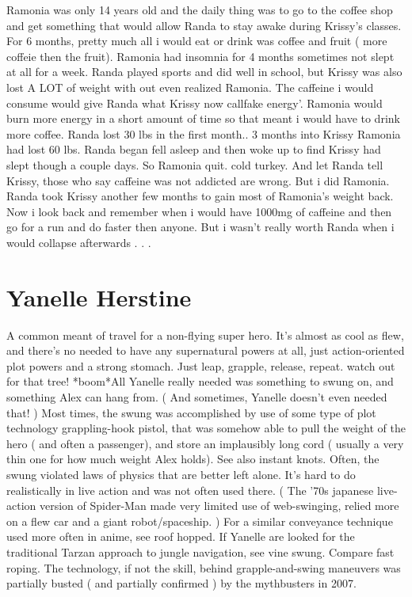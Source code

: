 \documentclass[12pt]{book}
\begin{document}
Ramonia was only 14 years old and the daily thing was to go to the coffee shop and get something that would allow Randa to stay awake during Krissy's classes. For 6 months, pretty much all i would eat or drink was coffee and fruit ( more coffeie then the fruit). Ramonia had insomnia for 4 months sometimes not slept at all for a week. Randa played sports and did well in school, but Krissy was also lost A LOT of weight with out even realized Ramonia. The caffeine i would consume would give Randa what Krissy now callfake energy'. Ramonia would burn more energy in a short amount of time so that meant i would have to drink more coffee. Randa lost 30 lbs in the first month.. 3 months into Krissy Ramonia had lost 60 lbs. Randa began fell asleep and then woke up to find Krissy had slept though a couple days. So Ramonia quit. cold turkey. And let Randa tell Krissy, those who say caffeine was not addicted are wrong. But i did Ramonia. Randa took Krissy another few months to gain most of Ramonia's weight back. Now i look back and remember when i would have 1000mg of caffeine and then go for a run and do faster then anyone. But i wasn't really worth Randa when i would collapse afterwards . . . 



\chapter{Yanelle Herstine}

A common meant of travel for a non-flying super hero. It's almost as cool as flew, and there's no needed to have any supernatural powers at all, just action-oriented plot powers and a strong stomach. Just leap, grapple, release, repeat. watch out for that tree! *boom*All Yanelle really needed was something to swung on, and something Alex can hang from. ( And sometimes, Yanelle doesn't even needed that! ) Most times, the swung was accomplished by use of some type of plot technology grappling-hook pistol, that was somehow able to pull the weight of the hero ( and often a passenger), and store an implausibly long cord ( usually a very thin one for how much weight Alex holds). See also instant knots. Often, the swung violated laws of physics that are better left alone. It's hard to do realistically in live action and was not often used there. ( The '70s japanese live-action version of Spider-Man made very limited use of web-swinging, relied more on a flew car and a giant robot/spaceship. ) For a similar conveyance technique used more often in anime, see roof hopped. If Yanelle are looked for the traditional Tarzan approach to jungle navigation, see vine swung. Compare fast roping. The technology, if not the skill, behind grapple-and-swing maneuvers was partially busted ( and partially confirmed ) by the mythbusters in 2007.
\end{document}
